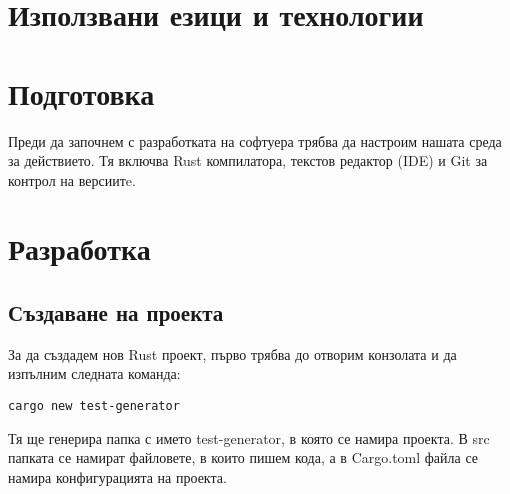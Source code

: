 \section{Използвани езици и технологии}



%
%





\section{Подготовка}
Преди да започнем с разработката на софтуера трябва да настроим нашата среда за
действието. Тя включва Rust компилатора, текстов редактор (IDE) и Git за
контрол на версиитe.





\section{Разработка}

\subsection{Създаване на проекта}
За да създадем нов Rust проект, първо трябва до отворим конзолата и да изпълним следната команда:
\begin{lstlisting}
cargo new test-generator
\end{lstlisting}

Тя ще генерира папка с името test-generator, в която се намира проекта. В src
папката се намират файловете, в които пишем кода, а в Cargo.toml файла се намира
конфигурацията на проекта.

